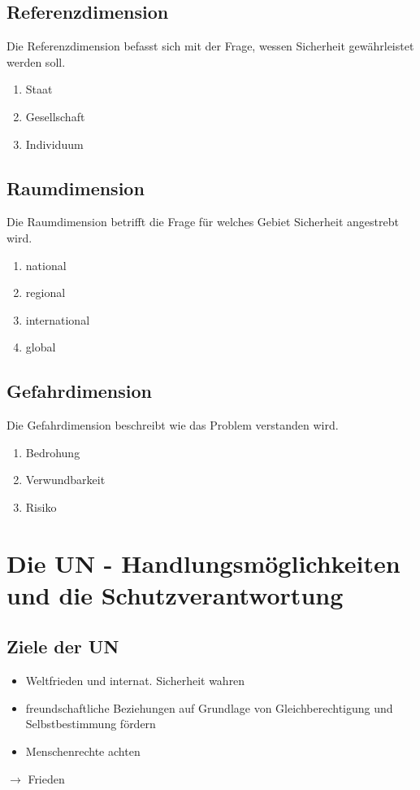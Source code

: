 \documentclass{article}
\begin{document}
\subsection*{Referenzdimension}
Die Referenzdimension befasst sich mit der Frage, wessen Sicherheit gewährleistet werden soll.
\begin{enumerate}
    \item Staat
    \item Gesellschaft
    \item Individuum
\end{enumerate} 
\subsection*{Raumdimension}
Die Raumdimension betrifft die Frage für welches Gebiet Sicherheit angestrebt wird.
\begin{enumerate}
    \item national
    \item regional
    \item international
    \item global
\end{enumerate}
\subsection*{Gefahrdimension}
Die Gefahrdimension beschreibt wie das Problem verstanden wird.
\begin{enumerate}
    \item Bedrohung
    \item Verwundbarkeit
    \item Risiko
\end{enumerate}
\section*{Die UN - Handlungsmöglichkeiten und die Schutzverantwortung}
\subsection*{Ziele der UN}
\begin{itemize}
    \item Weltfrieden und internat. Sicherheit wahren
    \item freundschaftliche Beziehungen auf Grundlage von Gleichberechtigung und Selbstbestimmung fördern
    \item Menschenrechte achten
\end{itemize}
$\rightarrow$ Frieden
\end{document}
